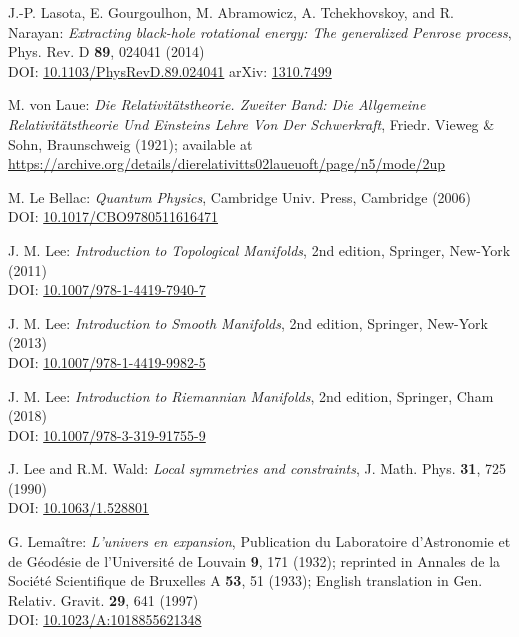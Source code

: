 \begin{thebibliography}{123}
J.-P. Lasota, E. Gourgoulhon, M. Abramowicz, A. Tchekhovskoy,
and R. Narayan:
{\em Extracting black-hole rotational energy: The generalized Penrose process},
Phys. Rev. D {\bf 89}, 024041 (2014)  \\
DOI: \href{https://doi.org/10.1103/PhysRevD.89.024041}{10.1103/PhysRevD.89.024041}\hfill
arXiv: \href{https://arxiv.org/abs/1310.7499}{1310.7499}

M. von Laue: {\em Die Relativitätstheorie. Zweiter Band: Die Allgemeine Relativitätstheorie Und Einsteins Lehre Von Der Schwerkraft},
Friedr. Vieweg \& Sohn, Braunschweig (1921); available at \\
\url{https://archive.org/details/dierelativitts02laueuoft/page/n5/mode/2up}

M. Le Bellac:
{\em Quantum Physics},
Cambridge Univ. Press, Cambridge (2006)\\
DOI: \href{https://doi.org/10.1017/CBO9780511616471}{10.1017/CBO9780511616471}

J. M. Lee:
{\em Introduction to Topological Manifolds}, 2nd edition,
Springer, New-York (2011)\\
DOI: \href{https://doi.org/10.1007/978-1-4419-7940-7}{10.1007/978-1-4419-7940-7}

J. M. Lee:
{\em Introduction to Smooth Manifolds}, 2nd edition,
Springer, New-York (2013)\\
DOI: \href{https://doi.org/10.1007/978-1-4419-9982-5}{10.1007/978-1-4419-9982-5}

J. M. Lee:
{\em Introduction to Riemannian Manifolds}, 2nd edition,
Springer, Cham (2018)\\
DOI: \href{https://doi.org/10.1007/978-3-319-91755-9}{10.1007/978-3-319-91755-9}

J. Lee and R.M. Wald:
{\em Local symmetries and constraints},
J. Math. Phys. {\bf 31}, 725 (1990)\\
DOI: \href{https://doi.org/10.1063/1.528801}{10.1063/1.528801}

G. Lemaître: {\em L'univers en expansion},
Publication du Laboratoire d'Astronomie et de Géodésie de l'Université
de Louvain {\bf 9},  171 (1932); reprinted in
Annales de la Société Scientifique de Bruxelles A {\bf 53}, 51 (1933);
English translation in
Gen. Relativ. Gravit. {\bf 29}, 641 (1997)\\
DOI: \href{https://doi.org/10.1023/A:1018855621348}{10.1023/A:1018855621348}


\end{thebibliography}
